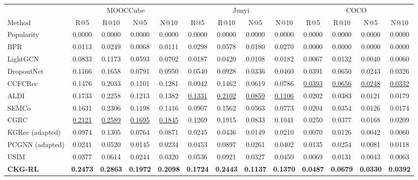 \documentclass[letterpaper]{article}
\newcommand{\sigmark}[1]{\rlap{\textsuperscript{\scriptsize #1}}}
\begin{document}
\begin{table}[t]
\centering
{
\small
\setlength{\tabcolsep}{1.35pt}
\renewcommand{\arraystretch}{0.98}
\begin{tabular}{lcccccccccccc}
\toprule
& \multicolumn{4}{c}{MOOCCube} & \multicolumn{4}{c}{Junyi} & \multicolumn{4}{c}{COCO} \\
\cmidrule(lr){2-5}\cmidrule(lr){6-9}\cmidrule(lr){10-13}
Method & R@5 & R@10 & N@5 & N@10 & R@5 & R@10 & N@5 & N@10 & R@5 & R@10 & N@5 & N@10 \\
\midrule
Popularity & 0.0000 & 0.0000 & 0.0000 & 0.0000 & 0.0000 & 0.0000 & 0.0000 & 0.0000 & 0.0000 & 0.0000 & 0.0000 & 0.0000 \\
BPR & 0.0113 & 0.0249 & 0.0068 & 0.0111 & 0.0298 & 0.0578 & 0.0180 & 0.0270 & 0.0000 & 0.0000 & 0.0000 & 0.0000 \\
LightGCN & 0.0833 & 0.1173 & 0.0593 & 0.0702 & 0.0187 & 0.0420 & 0.0108 & 0.0182 & 0.0067 & 0.0132 & 0.0040 & 0.0060 \\
DropoutNet & 0.1166 & 0.1658 & 0.0791 & 0.0950 & 0.0540 & 0.0928 & 0.0336 & 0.0460 & 0.0391 & 0.0650 & 0.0243 & 0.0326 \\
CCFCRec & 0.1476 & 0.2033 & 0.1101 & 0.1281 & 0.0942 & 0.1462 & 0.0619 & 0.0786 & \underline{0.0393} & \underline{0.0656} & \underline{0.0248} & \underline{0.0332} \\
ALDI & 0.1733 & 0.2258 & 0.1213 & 0.1382 & \underline{0.1331} & \underline{0.2102} & \underline{0.0859} & \underline{0.1106} & 0.0202 & 0.0383 & 0.0121 & 0.0179 \\
SEMCo & 0.1631 & 0.2306 & 0.1198 & 0.1416 & 0.0907 & 0.1562 & 0.0563 & 0.0773 & 0.0204 & 0.0354 & 0.0126 & 0.0174 \\
CGRC & \underline{0.2121} & \underline{0.2589} & \underline{0.1695} & \underline{0.1845} & 0.1269 & 0.1915 & 0.0833 & 0.1041 & 0.0250 & 0.0377 & 0.0168 & 0.0209 \\
KGRec (adapted) & 0.0974 & 0.1305 & 0.0764 & 0.0871 & 0.0245 & 0.0436 & 0.0149 & 0.0210 & 0.0070 & 0.0126 & 0.0042 & 0.0060 \\
PCGNN (adapted) & 0.0241 & 0.0520 & 0.0145 & 0.0234 & 0.0453 & 0.0897 & 0.0261 & 0.0402 & 0.0135 & 0.0254 & 0.0081 & 0.0118 \\
USIM & 0.0377 & 0.0614 & 0.0244 & 0.0320 & 0.0536 & 0.0921 & 0.0327 & 0.0450 & 0.0069 & 0.0131 & 0.0043 & 0.0063 \\
\midrule
\textbf{CKG-RL} & \textbf{0.2473}\sigmark{*} & \textbf{0.2863}\sigmark{*} & \textbf{0.1972}\sigmark{*} & \textbf{0.2098}\sigmark{*} & \textbf{0.1724}\sigmark{*} & \textbf{0.2443}\sigmark{*} & \textbf{0.1137}\sigmark{*} & \textbf{0.1370}\sigmark{*} & \textbf{0.0487}\sigmark{*} & \textbf{0.0679} & \textbf{0.0330}\sigmark{*} & \textbf{0.0392}\sigmark{*} \\

\end{tabular}}
\end{table}
\end{document}
